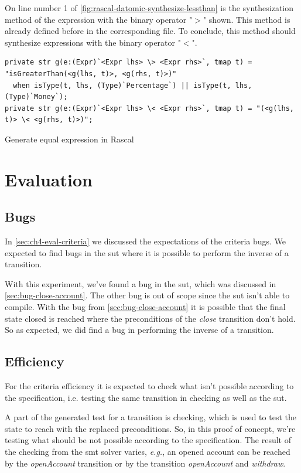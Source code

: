 On line number 1 of \autoref{fig:rascal-datomic-synthesize-lessthan} is the
synthesization method of the expression with the binary operator "$>$" shown.
This method is already defined before in the corresponding file. To conclude,
this method should synthesize expressions with the binary operator "$<$".

\begin{sourcecode}[h!]
\begin{lstlisting}[]
private str g(e:(Expr)`<Expr lhs> \> <Expr rhs>`, tmap t) = "isGreaterThan(<g(lhs, t)>, <g(rhs, t)>)"
  when isType(t, lhs, (Type)`Percentage`) || isType(t, lhs, (Type)`Money`);
private str g(e:(Expr)`<Expr lhs> \< <Expr rhs>`, tmap t) = "(<g(lhs, t)> \< <g(rhs, t)>)";
\end{lstlisting}
\caption{Generate equal expression in Rascal}\label{fig:rascal-datomic-synthesize-lessthan}
\end{sourcecode}
\FloatBarrier

\section{Evaluation}\label{sec:ch4-evaluation}

\subsection{Bugs}
In \autoref{sec:ch4-eval-criteria} we discussed the expectations of the criteria
bugs. We expected to find bugs in the \gls{sut} where it is possible to perform the
inverse of a transition.

With this experiment, we've found a bug in the \gls{sut}, which was
discussed in \autoref{sec:bug-close-account}. The other bug is out of scope
since the \gls{sut} isn't able to compile. With the bug from
\autoref{sec:bug-close-account} it is possible that the final state closed is
reached where the preconditions of the \textit{close} transition don't hold.
So as expected, we did find a bug in performing the inverse of a transition.

\subsection{Efficiency}
For the criteria efficiency it is expected to check what isn't possible
according to the specification, i.e. testing the same transition in checking as
well as the \gls{sut}.

A part of the generated test for a transition is checking, which is used to test
the state to reach with the replaced preconditions. So, in this proof of
concept, we're testing what should be not possible according to the
specification. The result of the checking from the \gls{smt} solver varies,
\textit{e.g.}, an opened account can be reached by the \textit{openAccount}
transition or by the transition \textit{openAccount} and \textit{withdraw}.

